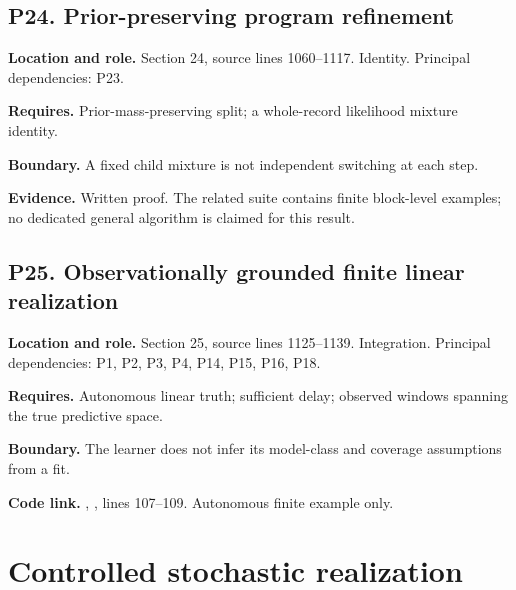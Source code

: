\documentclass[11pt,oneside,openany]{book}
\numberwithin{equation}{section}
\begin{document}
\par\noindent\begin{minipage}{\textwidth}
\subsection{P24. Prior-preserving program
refinement}\label{LSMRegister:p24.-prior-preserving-program-refinement}

\textbf{Location and role.} Section 24, source lines 1060--1117.
Identity. Principal dependencies: P23.

\textbf{Requires.} Prior-mass-preserving split; a whole-record
likelihood mixture identity.

\textbf{Boundary.} A fixed child mixture is not independent switching at
each step.

\textbf{Evidence.} Written proof. The related suite contains finite
block-level examples; no dedicated general algorithm is claimed for this
result.
\end{minipage}\par\medskip

\par\noindent\begin{minipage}{\textwidth}
\subsection{P25. Observationally grounded finite linear
realization}\label{LSMRegister:p25.-observationally-grounded-finite-linear-realization}

\textbf{Location and role.} Section 25, source lines 1125--1139.
Integration. Principal dependencies: P1, P2, P3, P4, P14, P15, P16, P18.

\textbf{Requires.} Autonomous linear truth; sufficient delay; observed
windows spanning the true predictive space.

\textbf{Boundary.} The learner does not infer its model-class and
coverage assumptions from a fit.

\textbf{Code link.} ,
, lines 107--109. Autonomous finite example only.
\end{minipage}\par\medskip


\section{Controlled stochastic
realization}\label{LSMRegister:controlled-stochastic-realization}
\end{document}
